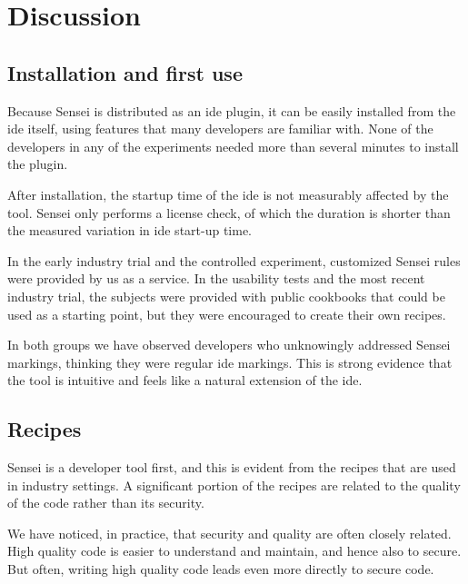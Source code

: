 \section{Discussion}
\label{sec:eval-sensei}
\subsection{Installation and first use}
Because Sensei is distributed as an \gls{ide} plugin, it can be easily installed from the \gls{ide} itself, using features that many developers are familiar with.
None of the developers in any of the experiments needed more than several minutes to install the plugin.

After installation, the startup time of the \gls{ide} is not measurably affected by the tool.
Sensei only performs a license check, of which the duration is shorter than the measured variation in \gls{ide} start-up time.

In the early industry trial and the controlled experiment, customized Sensei rules were provided by us as a service.
In the usability tests and the most recent industry trial, the subjects were provided with public cookbooks that could be used as a starting point, but they were encouraged to create their own recipes.

In both groups we have observed developers who unknowingly addressed Sensei markings, thinking they were regular \gls{ide} markings.
This is strong evidence that the tool is intuitive and feels like a natural extension of the \gls{ide}.

\subsection{Recipes}
Sensei is a developer tool first, and this is evident from the recipes that are used in industry settings.
A significant portion of the recipes are related to the quality of the code rather than its security.

We have noticed, in practice, that security and quality are often closely related.
High quality code is easier to understand and maintain, and hence also to secure.
But often, writing high quality code leads even more directly to secure code.

